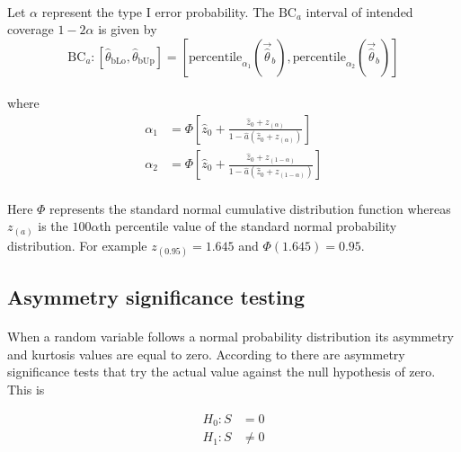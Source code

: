\documentclass[letterpaper]{article}
\begin{document}
\paragraph{}
Let $\alpha$ represent the type I error probability. The $\mathrm{BC}_a$ interval of intended coverage $1-2\alpha$ is given by
\begin{equation}
    \mathrm{BC}_a: \left[\hat{\theta}_\mathrm{bLo},\hat{\theta}_\mathrm{bUp}\right]= \left[\mathrm{percentile}_{\alpha_1}\left(\vec{\hat{\theta}}_{b}\right),\mathrm{percentile}_{\alpha_2}\left(\vec{\hat{\theta}}_{b}\right)\right]
\end{equation}
\paragraph{}
where
\begin{align}
     \alpha_1&=\Phi\left[\hat{z}_0+\frac{\hat{z}_0+z_{(\alpha)}}{1-\hat{a}\left(\hat{z}_0+z_{(\alpha)}\right)}\right] \\
     \alpha_2&=\Phi\left[\hat{z}_0+\frac{\hat{z}_0+z_{(1-\alpha)}}{1-\hat{a}\left(\hat{z}_0+z_{(1-\alpha)}\right)}\right]
\end{align}
\paragraph{}
Here $\Phi$ represents the standard normal cumulative distribution function whereas $z_{(a)}$ is the $100\alpha$th percentile value of the standard normal probability distribution. For example $z_{(0.95)}=1.645$ and $\Phi(1.645)=0.95$.

\FloatBarrier

\subsection*{Asymmetry significance testing}
\paragraph{}
When a random variable follows a normal probability distribution its asymmetry and kurtosis values are equal to zero. According to \cite{tabachnick2000using} there are asymmetry significance tests that try the actual value against the null hypothesis of zero. This is

\begin{align}
    H_0: S&=0 \\
    H_1: S&\ne0
\end{align}
\end{document}
